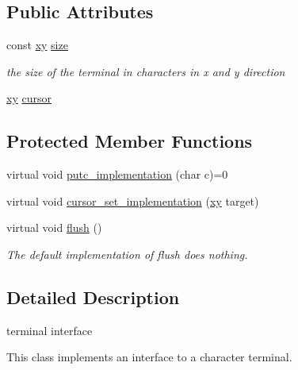 \subsection*{Public Attributes}
\begin{DoxyCompactItemize}
\item 
\mbox{\label{classhwlib_1_1terminal_ae9a152d0d8d1c1e0de12e9f363e46224}} 
const \hyperlink{classhwlib_1_1xy}{xy} \hyperlink{classhwlib_1_1terminal_ae9a152d0d8d1c1e0de12e9f363e46224}{size}
\begin{DoxyCompactList}\small\item\em the size of the terminal in characters in x and y direction \end{DoxyCompactList}\item 
\hyperlink{classhwlib_1_1xy}{xy} \hyperlink{classhwlib_1_1terminal_aeb11ed01f6b2dff73d624ae17955a32e}{cursor}
\end{DoxyCompactItemize}
\subsection*{Protected Member Functions}
\begin{DoxyCompactItemize}
\item 
virtual void \hyperlink{classhwlib_1_1terminal_a9444bf4339b2ac85f8c90abdaaa23f6c}{putc\+\_\+implementation} (char c)=0
\item 
virtual void \hyperlink{classhwlib_1_1terminal_ad4ea7dd275af1f707ce4020cbbc12547}{cursor\+\_\+set\+\_\+implementation} (\hyperlink{classhwlib_1_1xy}{xy} target)
\item 
\mbox{\label{classhwlib_1_1terminal_a541fbb14ebbd1efa59afe84f8903856e}} 
virtual void \hyperlink{classhwlib_1_1terminal_a541fbb14ebbd1efa59afe84f8903856e}{flush} ()
\begin{DoxyCompactList}\small\item\em The default implementation of flush does nothing. \end{DoxyCompactList}\end{DoxyCompactItemize}


\subsection{Detailed Description}
terminal interface

This class implements an interface to a character terminal.

